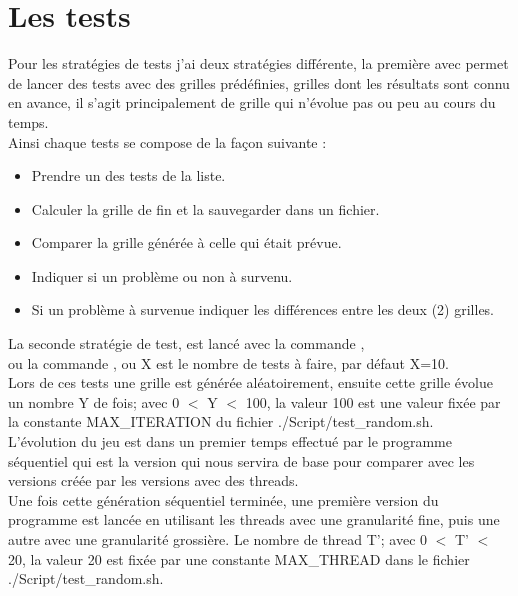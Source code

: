 \documentclass[10pt,a4paper]{article}
\begin{document}
\section{Les tests}
Pour les stratégies de tests j'ai deux stratégies différente, la première avec  permet de lancer des tests avec des grilles prédéfinies, grilles dont les résultats sont connu en avance, il s'agit principalement de grille qui n'évolue pas ou peu au cours du temps. \\

Ainsi chaque tests se compose de la façon suivante : 
\begin{itemize}
    \item Prendre un des tests de la liste.
    \item Calculer la grille de fin et la sauvegarder dans un fichier.
    \item Comparer la grille générée à celle qui était prévue.
    \item Indiquer si un problème ou non à survenu.
    \item Si un problème à survenue indiquer les différences entre les deux (2) grilles.
\end{itemize}

\hfill \break

La seconde stratégie de test, est lancé avec la commande , \\
ou la commande , ou X est le nombre de tests à faire, par défaut X=10. \\

Lors de ces tests une grille est générée aléatoirement, ensuite cette grille évolue un nombre Y de fois; avec 0 $<$ Y $<$ 100, la valeur 100 est une valeur fixée par la constante MAX\_ITERATION du fichier ./Script/test\_random.sh. \\

L'évolution du jeu est dans un premier temps effectué par le programme séquentiel qui est la version qui nous servira de base pour comparer avec les versions créée par les versions avec des threads. \\
Une fois cette génération séquentiel terminée, une première version du programme est lancée en utilisant les threads avec une granularité fine, puis une autre avec une granularité grossière. Le nombre de thread T'; avec 0 $<$ T' $<$ 20, la valeur 20 est fixée par une constante MAX\_THREAD dans le fichier ./Script/test\_random.sh. \\
\end{document}
